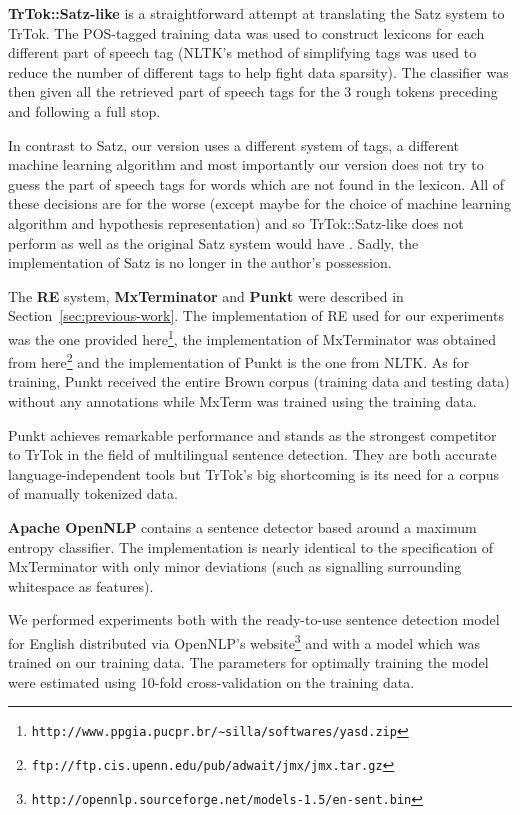 \textbf{TrTok::Satz-like} is a straightforward attempt at translating
the Satz system to TrTok. The POS-tagged training data was used to
construct lexicons for each different part of speech tag (NLTK's
method of simplifying tags was used to reduce the number of different
tags to help fight data sparsity). The classifier was then given all
the retrieved part of speech tags for the 3 rough tokens preceding and
following a full stop.

In contrast to Satz, our version uses a different system of tags, a
different machine learning algorithm and most importantly our version
does not try to guess the part of speech tags for words which are not
found in the lexicon. All of these decisions are for the worse (except
maybe for the choice of machine learning algorithm and hypothesis
representation) and so TrTok::Satz-like does not perform as well as
the original Satz system would have \cite{sbd-satz}. Sadly, the
implementation of Satz is no longer in the author's possession.

The \textbf{RE} system, \textbf{MxTerminator} and \textbf{Punkt} were
described in Section~\ref{sec:previous-work}. The implementation of RE
used for our experiments was the one provided
here\footnote{\texttt{http://www.ppgia.pucpr.br/∼silla/softwares/yasd.zip}},
the implementation of MxTerminator was obtained from
here\footnote{\texttt{ftp://ftp.cis.upenn.edu/pub/adwait/jmx/jmx.tar.gz}}
and the implementation of Punkt is the one from NLTK. As for training,
Punkt received the entire Brown corpus (training data and testing
data) without any annotations while MxTerm was trained using the
training data.

Punkt achieves remarkable performance and stands as the strongest
competitor to TrTok in the field of multilingual sentence detection.
They are both accurate language-independent tools but TrTok's big
shortcoming is its need for a corpus of manually tokenized data.

\textbf{Apache OpenNLP} contains a sentence detector based around a
maximum entropy classifier. The implementation is nearly identical to
the specification of MxTerminator with only minor deviations (such as
signalling surrounding whitespace as features).

We performed experiments both with the ready-to-use sentence detection
model for English distributed via OpenNLP's
website\footnote{\texttt{http://opennlp.sourceforge.net/models-1.5/en-sent.bin}}
and with a model which was trained on our training data. The
parameters for optimally training the model were estimated using
10-fold cross-validation on the training data.

